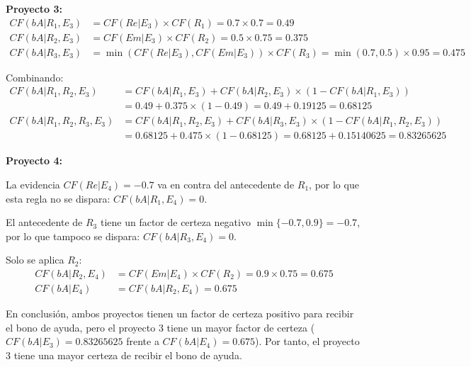 \documentclass[11pt,a4paper]{article}
\begin{document}
\textbf{Proyecto 3:}
\begin{align*}
    CF(bA|R_1, E_3) &= CF(Re|E_3) \times CF(R_1) = 0.7 \times 0.7 = 0.49 \\
    CF(bA|R_2, E_3) &= CF(Em|E_3) \times CF(R_2) = 0.5 \times 0.75 = 0.375 \\
    CF(bA|R_3, E_3) &= \min(CF(Re|E_3), CF(Em|E_3)) \times CF(R_3) = \min(0.7, 0.5) \times 0.95 = 0.475
\end{align*}

Combinando:
\begin{align*}
    CF(bA|R_1,R_2, E_3) &= CF(bA|R_1, E_3) + CF(bA|R_2, E_3) \times (1 - CF(bA|R_1, E_3)) \\
                       &= 0.49 + 0.375 \times (1 - 0.49) = 0.49 + 0.19125 = 0.68125 \\
    CF(bA|R_1,R_2,R_3,E_3) &= CF(bA|R_1,R_2, E_3) + CF(bA|R_3, E_3) \times (1 - CF(bA|R_1,R_2, E_3)) \\
               &= 0.68125 + 0.475 \times (1 - 0.68125) = 0.68125 + 0.15140625 = 0.83265625
\end{align*}

\textbf{Proyecto 4:}

La evidencia $CF(Re|E_4)=-0.7$ va en contra del antecedente de $R_1$, por lo que esta regla no se dispara: $CF(bA|R_1, E_4) = 0$.

El antecedente de $R_3$ tiene un factor de certeza negativo $\min\{-0.7, 0.9\}=-0.7$, por lo que tampoco se dispara: $CF(bA|R_3, E_4) = 0$.

Solo se aplica $R_2$:
\begin{align*}
    CF(bA|R_2, E_4) &= CF(Em|E_4) \times CF(R_2) = 0.9 \times 0.75 = 0.675 \\
    CF(bA|E_4) &= CF(bA|R_2, E_4) = 0.675
\end{align*}

En conclusión, ambos proyectos tienen un factor de certeza positivo para recibir el bono de ayuda, pero el proyecto 3
tiene un mayor factor de certeza ($CF(bA|E_3) = 0.83265625$ frente a $CF(bA|E_4) = 0.675$). Por tanto, el proyecto 3 tiene una mayor certeza de recibir el bono de ayuda.

\clearpage
\end{document}
